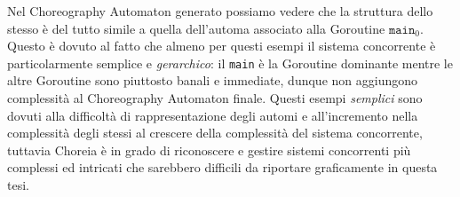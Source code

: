 Nel Choreography Automaton generato possiamo vedere che la struttura dello stesso è del tutto simile a quella dell'automa associato alla Goroutine $\texttt{main}_0$. Questo è dovuto al fatto che almeno per questi esempi il sistema concorrente è particolarmente semplice e \emph{gerarchico}: il \texttt{main} è la Goroutine dominante mentre le altre Goroutine sono piuttosto banali e immediate, dunque non aggiungono complessità al Choreography Automaton finale. Questi esempi \emph{semplici} sono dovuti alla difficoltà di rappresentazione degli automi e all'incremento nella complessità degli stessi al crescere della complessità del sistema concorrente, tuttavia Choreia è in grado di riconoscere e gestire sistemi concorrenti più complessi ed intricati che sarebbero difficili da riportare graficamente in questa tesi.
\begin{figure}[h!]
    \centering
\end{figure}


